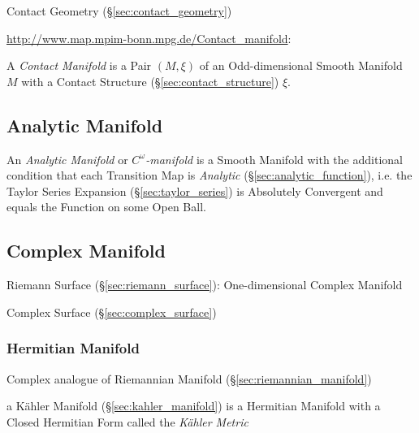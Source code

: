 \fist Contact Geometry (\S\ref{sec:contact_geometry})

\url{http://www.map.mpim-bonn.mpg.de/Contact_manifold}:

A \emph{Contact Manifold} is a Pair $(M,\xi)$ of an Odd-dimensional Smooth
Manifold $M$ with a Contact Structure (\S\ref{sec:contact_structure}) $\xi$.



\subsection{Analytic Manifold}\label{sec:analytic_manifold}

An \emph{Analytic Manifold} or \emph{$C^\omega$-manifold} is a Smooth Manifold
with the additional condition that each Transition Map is \emph{Analytic}
(\S\ref{sec:analytic_function}), i.e. the Taylor Series Expansion
(\S\ref{sec:taylor_series}) is Absolutely Convergent and equals the Function on
some Open Ball.



\subsection{Complex Manifold}\label{sec:complex_manifold}

Riemann Surface (\S\ref{sec:riemann_surface}): One-dimensional Complex
Manifold


Complex Surface (\S\ref{sec:complex_surface})



\subsubsection{Hermitian Manifold}\label{sec:hermitian_manifold}

Complex analogue of Riemannian Manifold (\S\ref{sec:riemannian_manifold})

a K\"ahler Manifold (\S\ref{sec:kahler_manifold}) is a Hermitian
Manifold with a Closed Hermitian Form called the \emph{K\"ahler
  Metric} %



